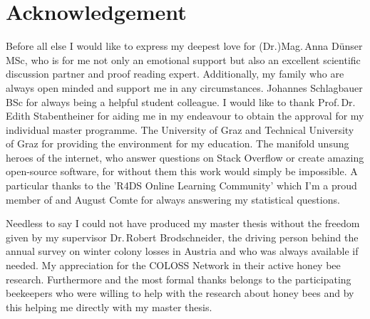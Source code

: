 \chapter*{Acknowledgement}
\label{sec:acknowledgement}
\vspace*{-10mm}

Before all else I would like to express my deepest love for (Dr.)Mag.\,Anna Dünser\,MSc, who is for me not only an emotional support but also an excellent scientific discussion partner and proof reading expert. Additionally, my family who are always open minded and support me in any circumstances. Johannes Schlagbauer\,BSc for always being a helpful student colleague. I would like to thank Prof.\,Dr.\,Edith Stabentheiner for aiding me in my endeavour to obtain the approval for my individual master programme. The University of Graz and Technical University of Graz for providing the environment for my education. The manifold unsung heroes of the internet, who answer questions on Stack Overflow or create amazing open-source software, for without them this work would simply be impossible. A particular thanks to the 'R4DS Online Learning Community' which I'm a proud member of and August Comte for always answering my statistical questions.

Needless to say I could not have produced my master thesis without the freedom given by my supervisor Dr.\,Robert Brodschneider, the driving person behind the annual survey on winter colony losses in Austria and who was always available if needed. My appreciation for the COLOSS Network in their active honey bee research. Furthermore and the most formal thanks belongs to the participating beekeepers who were willing to help with the research about honey bees and by this helping me directly with my master thesis.